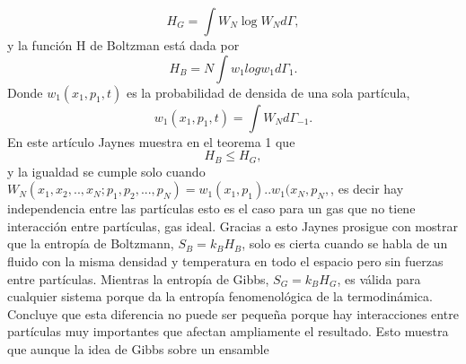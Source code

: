 \begin{equation}
H_{G}= \int W_{N} \log W_{N} d \Gamma,
\end{equation}
y la función H de Boltzman está dada por 
\begin{equation}
H_{B}=N \int w_{1} log w_{1} d\Gamma_{1}.
\end{equation}
Donde $w_{1}(x_{1},p_{1},t)$ es la probabilidad de densida de una sola partícula, 
\begin{equation}
w_{1}(x_{1},p_{1},t)= \int W_{N} d \Gamma_{-1}.
\end{equation}
En este artículo Jaynes muestra en el teorema 1 que 
\begin{equation}
H_{B} \leq H_{G},
\end{equation}
y la igualdad se cumple solo cuando $W_{N}(x_{1},x_{2},..,x_{N};p_{1},p_{2},...,p_{N})=w_{1}(x_{1},p_{1})..w_{1}(x_{N},p_{N},$,  es decir hay independencia entre las partículas esto es el caso para un gas que no tiene interacción entre partículas, gas ideal. Gracias a esto Jaynes prosigue con mostrar que la entropía de Boltzmann, $S_{B}=k_{B}H_{B}$, solo es cierta cuando se habla de un fluido con la misma densidad y temperatura en todo el espacio pero sin fuerzas entre partículas. Mientras la entropía de Gibbs, $S_{G}=k_{B}H_{G}$, es válida para cualquier sistema porque da la entropía fenomenológica de la termodinámica. Concluye que esta diferencia no puede ser pequeña porque hay interacciones entre partículas muy importantes que afectan ampliamente el resultado. Esto muestra que aunque la idea de Gibbs sobre un ensamble 





















